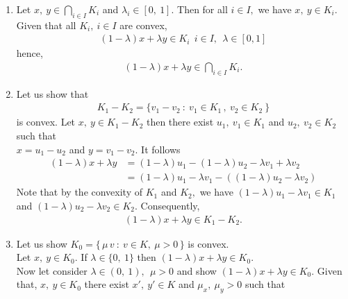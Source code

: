 \documentclass{ExerciseSheet}
\newif\ifsolutions
\begin{document}
\ifsolutions
\vskip 0.3cm
\begin{solution}
    \begin{enumerate}
        \item Let $x,~y\in \bigcap_{i\in I} K_i$ and $\lambda_i\in [0,~1].$ Then for all $i\in I,$ we have $x,~y\in K_i.$
            Given that all $K_i,~i\in I$ are convex, \\
            \begin{align*}
                (1-\lambda)x+\lambda y\in K_i~~ i\in I,~~  \lambda\in [0, 1]
            \end{align*}
            hence,
            \begin{align*}
                (1-\lambda)x+\lambda y\in \bigcap_{i\in I} K_i.
            \end{align*}
        \item Let us show that 
                \begin{align*}
                    K_1 - K_2 =\{ v_1 - v_2 \ : \ v_1\in K_1\,,\ v_2\in K_2 \ \} 
                \end{align*}
                is convex. Let $x,~y\in K_1 - K_2$ then there exist $u_1,~v_1\in K_1$ and $u_2,~v_2\in K_2$ such that\\ $x=u_1-u_2$ and $y=v_1-v_2.$ It follows
                \begin{align*}
                    (1-\lambda)x+\lambda y  &= (1-\lambda)u_1-(1-\lambda)u_2-\lambda v_1+\lambda v_2 \\
                                            &= (1-\lambda)u_1 - \lambda v_1 - \left( (1-\lambda)u_2 - \lambda v_2 \right)
                \end{align*}
            Note that by the convexity of $K_1$ and $K_2,$ we have $(1-\lambda)u_1 - \lambda v_1\in K_1$ and $(1-\lambda)u_2 - \lambda v_2 \in K_2.$ Consequently,
            \begin{align*}
                (1-\lambda)x+\lambda y \in  K_1 - K_2.
            \end{align*}
        \item Let us show $K_0=\{\,\mu\,v \ : \ v\in K,\ \mu>0\,\}$ is convex.\\
           Let $x,~y\in K_0.$ If $\lambda\in\{0,~1\}$ then $ (1-\lambda)x+\lambda y \in K_0.$\\
            Now let consider $\lambda\in (0,~1),~~\mu>0$ and show $ (1-\lambda)x+\lambda y \in K_0.$ Given that,  $x,~y\in K_0$ there exist $x',~y'\in K$ and $\mu_x,~\mu_y>0$ such that
             \begin{align*}

\end{align*}
\end{enumerate}
\end{solution}
\end{document}
